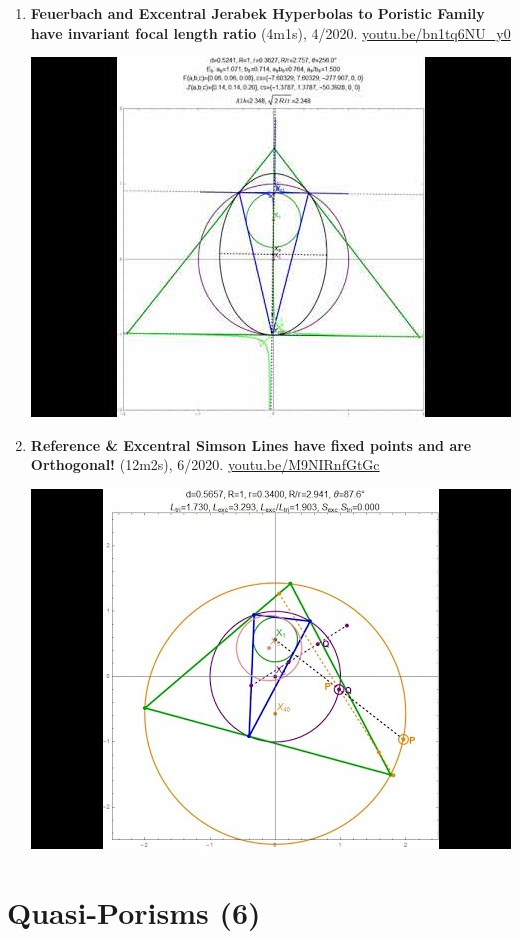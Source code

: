 \documentclass[12pt]{article}
\begin{document}
\begin{enumerate}[resume]
% 
\item \textbf{Feuerbach and Excentral Jerabek Hyperbolas to Poristic Family have invariant focal length ratio} (4m1s), 4/2020. \href{https://youtu.be/bn1tq6NU_y0}{\url{youtu.be/bn1tq6NU\_y0}}
\begin{center}\includegraphics[width=.5\textwidth]{pics/bn1tq6NU_y0.jpg}\end{center}
% 
\item \textbf{Reference \& Excentral Simson Lines have fixed points and are Orthogonal!} (12m2s), 6/2020. \href{https://youtu.be/M9NIRnfGtGc}{\url{youtu.be/M9NIRnfGtGc}}
\begin{center}\includegraphics[width=.5\textwidth]{pics/M9NIRnfGtGc.jpg}\end{center}
% 
\end{enumerate}

\section{Quasi-Porisms (6)}
\end{document}

